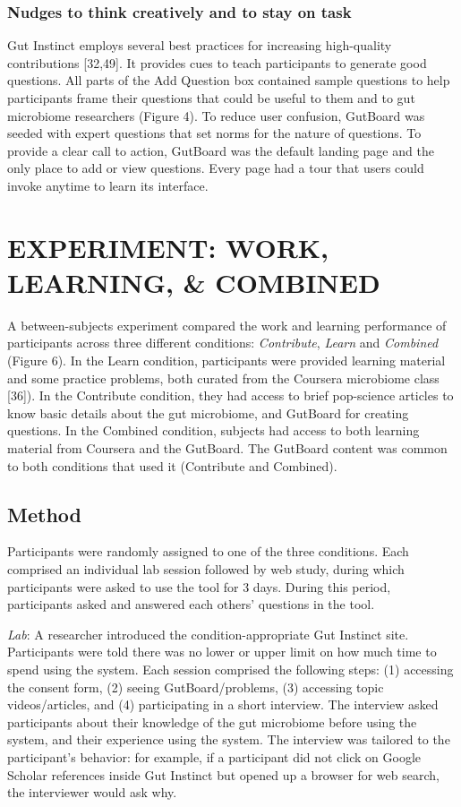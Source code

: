 \subsubsection{Nudges to think creatively and to stay on task}
Gut Instinct employs several best practices for increasing high-quality contributions [32,49]. It provides cues to teach participants to generate good questions. All parts of the Add Question box contained sample questions to help participants frame their questions that could be useful to them and to gut microbiome researchers (Figure 4). To reduce user confusion, GutBoard was seeded with expert questions that set norms for the nature of questions. To provide a clear call to action, GutBoard was the default landing page and the only place to add or view questions. Every page had a tour that users could invoke anytime to learn its interface.

\section{EXPERIMENT: WORK, LEARNING, \& COMBINED }
A between-subjects experiment compared the work and learning performance of participants across three different conditions: \textit{Contribute}, \textit{Learn} and \textit{Combined} (Figure 6). In the Learn condition, participants were provided learning material and some practice problems, both curated from the Coursera microbiome class [36]). In the Contribute condition, they had access to brief pop-science articles to know basic details about the gut microbiome, and GutBoard for creating questions. In the Combined condition, subjects had access to both learning material from Coursera and the GutBoard. The GutBoard content was common to both conditions that used it (Contribute and Combined).

\subsection{Method}
Participants were randomly assigned to one of the three conditions. Each comprised an individual lab session followed by web study, during which participants were asked to use the tool for 3 days. During this period, participants asked and answered each others’ questions in the tool.

\textit{Lab}: A researcher introduced the condition-appropriate Gut Instinct site. Participants were told there was no lower or upper limit on how much time to spend using the system. Each session comprised the following steps: (1) accessing the consent form, (2) seeing GutBoard/problems, (3) accessing topic videos/articles, and (4) participating in a short interview. The interview asked participants about their knowledge of the gut microbiome before using the system, and their experience using the system. The interview was tailored to the participant’s behavior: for example, if a participant did not click on Google Scholar references inside Gut Instinct but opened up a browser for web search, the interviewer would ask why.
 
